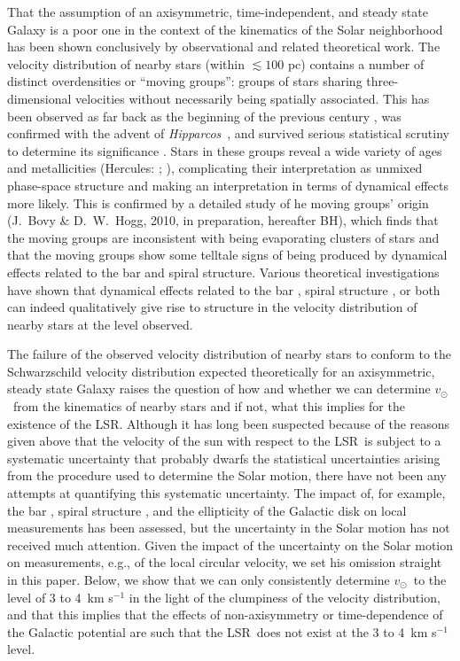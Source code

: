 \documentclass[12pt,preprint]{aastex}
\newcommand{\eg}{e.g.}
\newcommand{\Hipparcos}{\textsl{Hipparcos}}
\newcommand{\vsunlsr}{\ensuremath{v_\odot}}
\newcommand{\lsrabb}{LSR}
\newcommand{\resultrange}{3 to 4}
\newcommand{\bh}{BH}
\begin{document}
That the assumption of an axisymmetric, time-independent, and steady
state Galaxy is a poor one in the context of the kinematics of the
Solar neighborhood has been shown conclusively by observational and
related theoretical work. The velocity distribution of nearby stars
(within $\lesssim 100$ pc) contains a number of distinct overdensities
or ``moving groups'': groups of stars sharing three-dimensional
velocities without necessarily being spatially associated. This has
been observed as far back as the beginning of the previous century
\citep[\eg,][]{kapteyn05a}, was confirmed with the advent of
\Hipparcos\ \citep[\eg,][]{Dehnen98a}, and survived serious
statistical scrutiny to determine its significance
\citep{Bovy09a}. Stars in these groups reveal a wide variety of ages
\citep[Pleiades, Hyades, \& Sirius:][]{Famaey05a,Famaey08a} and
metallicities (Hercules: \citealt{Raboud98a}; \citealt{Bensby07a}),
complicating their interpretation as unmixed phase-space structure and
making an interpretation in terms of dynamical effects more
likely. This is confirmed by a detailed study of he moving groups'
origin (J.~Bovy \& D.~W.~Hogg, 2010, in preparation, hereafter \bh),
which finds that the moving groups are inconsistent with being
evaporating clusters of stars and that the moving groups show some
telltale signs of being produced by dynamical effects related to the
bar and spiral structure. Various theoretical investigations have
shown that dynamical effects related to the bar
\citep{Dehnen01a,Fux01a}, spiral structure
\citep{deSimone04a,Quillen05a}, or both
\citep{Chakrabarty07a,Antoja09a} can indeed qualitatively give rise to
structure in the velocity distribution of nearby stars at the level
observed.

The failure of the observed velocity distribution of nearby stars to
conform to the Schwarzschild velocity distribution expected
theoretically for an axisymmetric, steady state Galaxy raises the
question of how and whether we can determine \vsunlsr\ from the
kinematics of nearby stars and if not, what this implies for the
existence of the \lsrabb. Although it has long been suspected because
of the reasons given above that the velocity of the sun with respect
to the \lsrabb\ is subject to a systematic uncertainty that probably
dwarfs the statistical uncertainties arising from the procedure used
to determine the Solar motion, there have not been any attempts at
quantifying this systematic uncertainty. The impact of, for example,
the bar \citep{Minchev07b}, spiral structure \citep{Minchev07a}, and
the ellipticity of the Galactic disk \citep{Kuijken94a} on local
measurements has been assessed, but the uncertainty in the Solar
motion has not received much attention. Given the impact of the
uncertainty on the Solar motion on measurements, \eg, of the local
circular velocity, we set his omission straight in this paper. Below,
we show that we can only consistently determine \vsunlsr\ to the level
of \resultrange\ km s$^{-1}$ in the light of the clumpiness of the
velocity distribution, and that this implies that the effects of
non-axisymmetry or time-dependence of the Galactic potential are such
that the \lsrabb\ does not exist at the \resultrange\ km s$^{-1}$
level.
\end{document}
